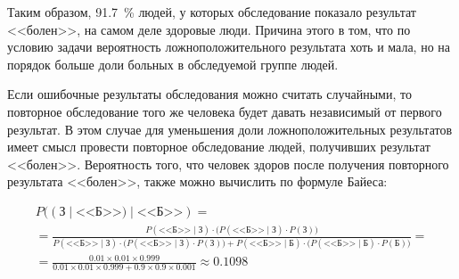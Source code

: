 \begin{enumerate}
Таким образом, 91.7 \% людей, у которых обследование показало результат <<болен>>, на самом деле здоровые люди. Причина этого в том, что по условию задачи вероятность ложноположительного результата хоть и мала, но на порядок больше доли больных в обследуемой группе людей.

Если ошибочные результаты обследования можно считать случайными, то повторное обследование того же человека будет давать независимый от первого результат. В этом случае для уменьшения доли ложноположительных результатов имеет смысл провести повторное обследование людей, получивших результат <<болен>>. Вероятность того, что человек здоров после получения повторного результата <<болен>>, также можно вычислить по формуле Байеса:

\begin{gather*}
P\bigl((\text{З} \mid \text{<<Б>>}\bigr) \mid \text{<<Б>>})=\\=
\frac
{P(\text{<<Б>>} \mid \text{З}) \cdot \bigl(P(\text{<<Б>>} \mid \text{З}) \cdot P(\text{З})\bigr) }
{P(\text{<<Б>>} \mid \text{З}) \cdot \bigl(P(\text{<<Б>>} \mid \text{З}) \cdot P(\text{З}) \bigr) + P(\text{<<Б>>} \mid \text{Б}) \cdot \bigl( P(\text{<<Б>>} \mid \text{Б}) \cdot P(\text{Б}) \bigr) } =\\ =
\frac
{0.01 \times 0.01 \times 0.999}
{0.01 \times 0.01 \times 0.999 + 0.9 \times 0.9 \times 0.001}
\approx
0.1098
\end{gather*}

\end{enumerate} 